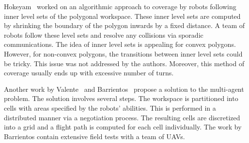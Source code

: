 \documentclass[../main.tex]{subfiles}
\begin{document}

Hokeyam~\cite{hokayem2007dynamic} worked on an algorithmic approach to coverage by robots following inner level sets of the polygonal workspace. These inner level sets are computed by shrinking the boundary of the polygon inwards by a fixed distance. A team of robots follow these level sets and resolve any collisions via sporadic communications. The idea of inner level sets is appealing for convex polygons. However, for non-convex polygons, the transitions between inner level sets could be tricky. This issue was not addressed by the authors. Moreover, this method of coverage usually ends up with excessive number of turns.


Another work by Valente~\cite{valente2011multi} and Barrientos~\cite{barrientos2011aerial} propose a solution to the multi-agent problem. The solution involves several steps. The workspace is partitioned into cells with areas specified by the robots' abilities. This is performed in a distributed manner via a negotiation process. The resulting cells are discretized into a grid and a flight path is computed for each cell individually. The work by Barrientos contain extensive field tests with a team of UAVs.


\end{document}
